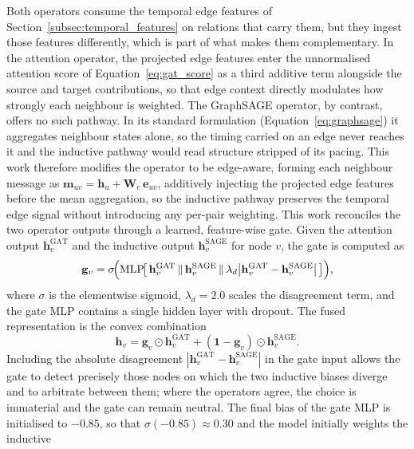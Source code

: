 \documentclass[%
    BCOR=10mm,
    DIV=13,
    toc=bibliography,
    toc=listof,
    oneside,
    12pt,
]{scrbook}
\begin{document}
Both operators consume the temporal edge features of
Section~\ref{subsec:temporal_features} on relations that carry them, but they
ingest those features differently, which is part of what makes them
complementary. In the attention operator, the projected edge features enter the
unnormalised attention score of Equation~\ref{eq:gat_score} as a third additive
term alongside the source and target contributions, so that edge context
directly modulates how strongly each neighbour is weighted. The GraphSAGE
operator, by contrast, offers no such pathway. In its standard formulation
(Equation~\ref{eq:graphsage}) it aggregates neighbour states alone, so the timing
carried on an edge never reaches it and the inductive pathway would read structure
stripped of its pacing. This work therefore modifies the operator to be
edge-aware, forming each neighbour message as
$\mathbf{m}_{uv} = \mathbf{h}_u + \mathbf{W}_e\,\mathbf{e}_{uv}$, additively
injecting the projected edge features before the mean aggregation, so the
inductive pathway preserves the temporal edge signal without introducing any
per-pair weighting. This work reconciles the two operator outputs through a
learned, feature-wise gate. Given the
attention output $\mathbf{h}^{\mathrm{GAT}}_v$ and the inductive output
$\mathbf{h}^{\mathrm{SAGE}}_v$ for node $v$, the gate is computed as
\begin{equation}
  \mathbf{g}_v = \sigma\!\Bigl(
    \mathrm{MLP}\!\bigl[\,
      \mathbf{h}^{\mathrm{GAT}}_v \,\|\,
      \mathbf{h}^{\mathrm{SAGE}}_v \,\|\,
      \lambda_d \bigl|\mathbf{h}^{\mathrm{GAT}}_v - \mathbf{h}^{\mathrm{SAGE}}_v\bigr|
    \,\bigr]\Bigr),
  \label{eq:hybrid_gate}
\end{equation}
where $\sigma$ is the elementwise sigmoid, $\lambda_d = 2.0$ scales the
disagreement term, and the gate MLP contains a single hidden layer with
dropout. The fused representation is the convex combination
\begin{equation}
  \mathbf{h}_v = \mathbf{g}_v \odot \mathbf{h}^{\mathrm{GAT}}_v
  + (\mathbf{1} - \mathbf{g}_v) \odot \mathbf{h}^{\mathrm{SAGE}}_v.
  \label{eq:hybrid_fuse}
\end{equation}
Including the absolute disagreement
$|\mathbf{h}^{\mathrm{GAT}}_v - \mathbf{h}^{\mathrm{SAGE}}_v|$ in the gate
input allows the gate to detect precisely those nodes on which the two
inductive biases diverge and to arbitrate between them; where the operators
agree, the choice is immaterial and the gate can remain neutral. The final
bias of the gate MLP is initialised to $-0.85$, so that
$\sigma(-0.85) \approx 0.30$ and the model initially weights the inductive
\end{document}
